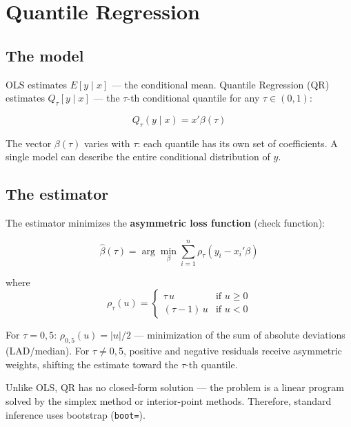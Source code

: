 \chapter{Quantile Regression}
\label{cap:qreg}

\section{The model}

OLS estimates $E[y \mid x]$ --- the conditional mean. Quantile Regression
(QR) estimates $Q_\tau[y \mid x]$ --- the $\tau$-th conditional quantile for
any $\tau \in (0,1)$:

\[
  Q_\tau(y \mid x) = x'\beta(\tau)
\]

The vector $\beta(\tau)$ varies with $\tau$: each quantile has its own set
of coefficients. A single model can describe the entire conditional
distribution of $y$.

\section{The estimator}

The estimator minimizes the \textbf{asymmetric loss function} (check function):

\[
  \hat\beta(\tau) = \arg\min_\beta \sum_{i=1}^{n} \rho_\tau(y_i - x_i'\beta)
\]

where
\[
  \rho_\tau(u) =
  \begin{cases}
    \tau\, u       & \text{if } u \geq 0 \\
    (\tau - 1)\,u  & \text{if } u < 0
  \end{cases}
\]

For $\tau = 0{,}5$: $\rho_{0,5}(u) = |u|/2$ --- minimization of the sum of
absolute deviations (LAD/median). For $\tau \neq 0{,}5$, positive and
negative residuals receive asymmetric weights, shifting the estimate toward the
$\tau$-th quantile.

\begin{nota}
  Unlike OLS, QR has no closed-form solution --- the problem
  is a linear program solved by the simplex method or interior-point methods.
  Therefore, standard inference uses bootstrap (\lstinline{boot=}).
\end{nota}


